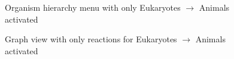 \begin{figure}[hbt]
    \caption{\label{fig:kegg_screenshot_animals_only_list} Organism hierarchy
    menu with only Eukaryotes $\rightarrow$ Animals activated}
\end{figure}

\begin{figure}[hbt]
    \caption{\label{fig:kegg_screenshot_animals_only_graph} Graph view with only
    reactions for Eukaryotes $\rightarrow$ Animals activated}
\end{figure}

